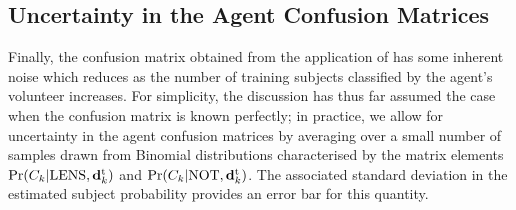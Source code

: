 \documentclass[useAMS,usenatbib,a4paper]{mn2e}
\begin{document}
\subsection{Uncertainty in the Agent Confusion Matrices}
\label{appendix:swap:uncertainty}

Finally, the confusion matrix obtained from the application of
 has some inherent noise which reduces as the
number of training subjects classified by the agent's volunteer
increases. For simplicity, the discussion has thus far assumed the case
when the confusion matrix is known perfectly; in practice, we allow for
uncertainty in the agent confusion matrices by averaging over a small
number of samples drawn from Binomial distributions characterised by the
matrix elements ${\rm Pr}(C_k|{\rm LENS},{\mathbf{d}^{\rm t}_k})$ and  ${\rm Pr}(C_k|{\rm NOT},{\mathbf{d}^{\rm t}_k})$. The
associated standard deviation in the estimated subject probability
provides an error bar for this quantity.

% 

\end{document}
